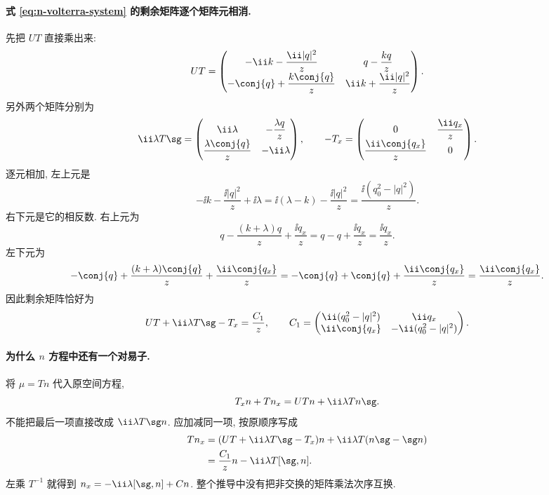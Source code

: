 \paragraph{式 \eqref{eq:n-volterra-system} 的剩余矩阵逐个矩阵元相消.}
先把 $U T$ 直接乘出来:
\[
U T=\begin{pmatrix}
-\ii k-\dfrac{\ii|q|^2}{z}&q-\dfrac{kq}{z}\\
-\conj{q}+\dfrac{k\conj{q}}{z}&\ii k+\dfrac{\ii|q|^2}{z}
\end{pmatrix}.
\]
另外两个矩阵分别为
\[
\ii\lambda T\sg
=\begin{pmatrix}
\ii\lambda&-\dfrac{\lambda q}{z}\\
\dfrac{\lambda\conj{q}}{z}&-\ii\lambda
\end{pmatrix},
\qquad
- T_x
=\begin{pmatrix}0&\dfrac{\ii q_x}{z}\\
\dfrac{\ii\conj{q_x}}{z}&0\end{pmatrix}.
\]
逐元相加, 左上元是
\[
-\ii k-\dfrac{\ii|q|^2}{z}+\ii\lambda
=\ii(\lambda-k)-\dfrac{\ii|q|^2}{z}
=\dfrac{\ii(q_0^2-|q|^2)}{z}.
\]
右下元是它的相反数.
右上元为
\[
q-\dfrac{(k+\lambda)q}{z}+\dfrac{\ii q_x}{z}
=q-q+\dfrac{\ii q_x}{z}
=\dfrac{\ii q_x}{z}.
\]
左下元为
\[
-\conj{q}+\dfrac{(k+\lambda)\conj{q}}{z}
+\dfrac{\ii\conj{q_x}}{z}
=-\conj{q}+\conj{q}+\dfrac{\ii\conj{q_x}}{z}
=\dfrac{\ii\conj{q_x}}{z}.
\]
因此剩余矩阵恰好为
\[
U T+\ii\lambda T\sg- T_x
=\dfrac{ C_1}{z},
\qquad
 C_1=\begin{pmatrix}
\ii(q_0^2-|q|^2)&\ii q_x\\
\ii\conj{q_x}&-\ii(q_0^2-|q|^2)
\end{pmatrix}.
\]

\paragraph{为什么 $n$ 方程中还有一个对易子.}
将 $\mu= Tn$ 代入原空间方程,
\[
 T_xn+ Tn_x
=U Tn+\ii\lambda Tn\sg.
\]
不能把最后一项直接改成 $\ii\lambda T\sg n$.
应加减同一项, 按原顺序写成
\begin{align*}
 Tn_x
&=(U T+\ii\lambda T\sg- T_x)n
+\ii\lambda T(n\sg-\sg n)\\
&=\dfrac{ C_1}{z}n
-\ii\lambda T[\sg,n].
\end{align*}
左乘 $ T^{-1}$ 就得到
$n_x=-\ii\lambda[\sg,n]+ Cn$.
整个推导中没有把非交换的矩阵乘法次序互换.

